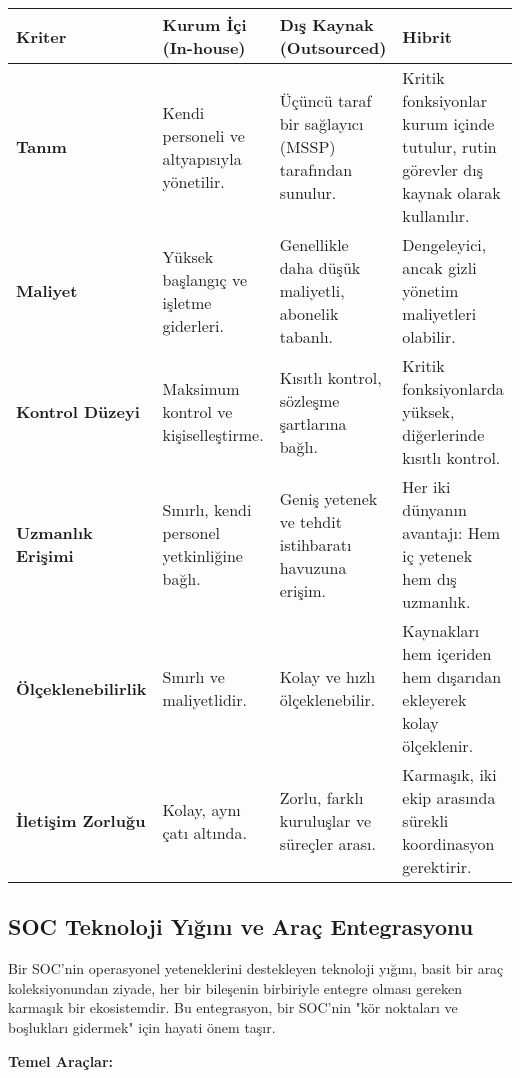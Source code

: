 \begin{longtable}{|p{3cm}|p{3cm}|p{3cm}|p{3cm}|}
\hline
\textbf{Kriter} & \textbf{Kurum İçi (In-house)} & \textbf{Dış Kaynak (Outsourced)} & \textbf{Hibrit} \\
\hline
\textbf{Tanım} & Kendi personeli ve altyapısıyla yönetilir. & Üçüncü taraf bir sağlayıcı (MSSP) tarafından sunulur. & Kritik fonksiyonlar kurum içinde tutulur, rutin görevler dış kaynak olarak kullanılır. \\
\hline
\textbf{Maliyet} & Yüksek başlangıç ve işletme giderleri. & Genellikle daha düşük maliyetli, abonelik tabanlı. & Dengeleyici, ancak gizli yönetim maliyetleri olabilir. \\
\hline
\textbf{Kontrol Düzeyi} & Maksimum kontrol ve kişiselleştirme. & Kısıtlı kontrol, sözleşme şartlarına bağlı. & Kritik fonksiyonlarda yüksek, diğerlerinde kısıtlı kontrol. \\
\hline
\textbf{Uzmanlık Erişimi} & Sınırlı, kendi personel yetkinliğine bağlı. & Geniş yetenek ve tehdit istihbaratı havuzuna erişim. & Her iki dünyanın avantajı: Hem iç yetenek hem dış uzmanlık. \\
\hline
\textbf{Ölçeklenebilirlik} & Sınırlı ve maliyetlidir. & Kolay ve hızlı ölçeklenebilir. & Kaynakları hem içeriden hem dışarıdan ekleyerek kolay ölçeklenir. \\
\hline
\textbf{İletişim Zorluğu} & Kolay, aynı çatı altında. & Zorlu, farklı kuruluşlar ve süreçler arası. & Karmaşık, iki ekip arasında sürekli koordinasyon gerektirir. \\
\hline
\end{longtable}

\subsection{SOC Teknoloji Yığını ve Araç Entegrasyonu}

Bir SOC'nin operasyonel yeteneklerini destekleyen teknoloji yığını, basit bir araç koleksiyonundan ziyade, her bir bileşenin birbiriyle entegre olması gereken karmaşık bir ekosistemdir. Bu entegrasyon, bir SOC'nin "kör noktaları ve boşlukları gidermek" için hayati önem taşır.

\textbf{Temel Araçlar:}

